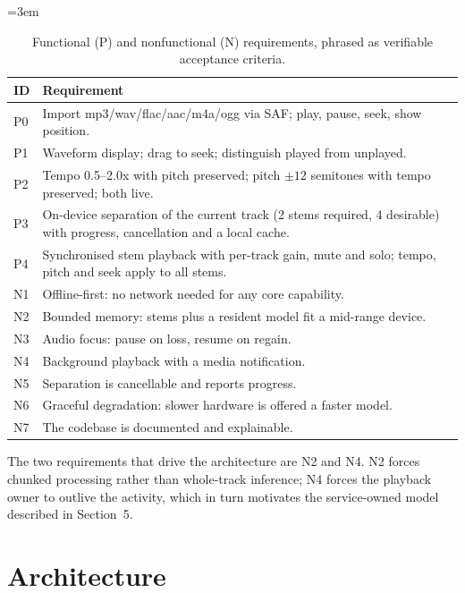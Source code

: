 \documentclass[letterpaper]{article} %
\newcommand{\nohyph}{\hyphenpenalty=10000 \exhyphenpenalty=10000 \tolerance=10000 \emergencystretch=3em}
\begin{document}
\begin{table}[t]
\begingroup
\centering
\footnotesize
\nohyph
\setlength{\tabcolsep}{3pt}
\begin{tabular}{@{}>{\raggedright\arraybackslash}p{0.82cm}>{\raggedright\arraybackslash}p{5.55cm}@{}}
\hline
\textbf{ID} & \textbf{Requirement} \\
\hline
P0 & Import mp3/wav/flac/aac/m4a/ogg via SAF; play, pause, seek, show position. \\
P1 & Waveform display; drag to seek; distinguish played from unplayed. \\
P2 & Tempo 0.5--2.0x with pitch preserved; pitch $\pm12$ semitones with
     tempo preserved; both live. \\
P3 & On-device separation of the current track (2 stems required, 4 desirable)
     with progress, cancellation and a local cache. \\
P4 & Synchronised stem playback with per-track gain, mute and solo; tempo,
     pitch and seek apply to all stems. \\
\hline
N1 & Offline-first: no network needed for any core capability. \\
N2 & Bounded memory: stems plus a resident model fit a mid-range device. \\
N3 & Audio focus: pause on loss, resume on regain. \\
N4 & Background playback with a media notification. \\
N5 & Separation is cancellable and reports progress. \\
N6 & Graceful degradation: slower hardware is offered a faster model. \\
N7 & The codebase is documented and explainable. \\
\hline
\end{tabular}
\caption{Functional (P) and non\-functional (N) requirements, phrased as
verifiable acceptance criteria.}
\label{tab:req}
\endgroup
\end{table}

The two requirements that drive the architecture are N2 and N4. N2 forces
chunked processing rather than whole-track inference; N4 forces the playback
owner to outlive the activity, which in turn motivates the service-owned model
described in Section~5.

\section{Architecture}\label{sec:arch}
\end{document}
